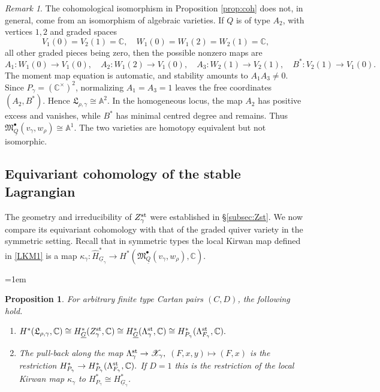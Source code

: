 \documentclass[11pt,reqno]{amsart}
\newtheorem{Proposition}[Theorem]{Proposition}
\theoremstyle{definition}
\theoremstyle{remark}
\newtheorem{Remark}[Theorem]{Remark}
\def\bbC{\mathbb C}
\def\dG{\underline G}
\def\dQ{\underline Q}
\def\scrX{\mathscr X}
\def\M{\mathfrak M}
\begin{document}
\begin{Remark}\label{rem:A2-not-isomorphic}
The cohomological isomorphism in Proposition \ref{prop:coh} does not, in general,
come from an isomorphism of algebraic varieties. If $Q$ is of type $A_2$, with vertices $1,2$ and graded spaces
\[
 V_1(0)=V_2(1)=\bbC,\quad
 W_1(0)=W_1(2)=W_2(1)=\bbC,
\]
all other graded pieces being zero, then the possible nonzero maps are
$$A_1:W_1(0)\to V_1(0),\quad
A_2:W_1(2)\to V_1(0),\quad
A_3:W_2(1)\to V_2(1),\quad
B^*:V_2(1)\to V_1(0).$$
The moment map equation is automatic, and stability amounts to
$A_1A_3\ne0$. Since $P_\gamma=(\mathbb C^\times)^2$, normalizing
$A_1=A_3=1$ leaves the free coordinates $(A_2,B^*)$. Hence
$\mathfrak L_{\rho,\gamma}\cong\mathbb A^2.$
In the homogeneous locus, the map $A_2$ has positive excess and vanishes,
while $B^*$ has minimal centred degree and remains. Thus
$\M_{\dQ}^\bullet(v_\gamma,w_\rho)\cong\mathbb A^1.$
The two varieties are homotopy equivalent but not isomorphic.
\end{Remark}



\subsection{Equivariant cohomology of the stable Lagrangian}\label{subsec:Zst-coh}
The geometry and irreducibility of $Z_\gamma^{\rm st}$ were established
in \S\ref{subsec:Zst}. We now compare its equivariant cohomology with
that of the graded quiver variety in the symmetric setting.
Recall that in symmetric types the local Kirwan map defined in \eqref{LKM1} is a map
$\kappa_\gamma: \widehat H^*_{\dG_\gamma}\to H^*(\M_{\dQ}^\bullet(v_\gamma,w_\rho),\bbC)$.


\begingroup\emergencystretch=1em
\begin{Proposition}\label{prop:cohZ}
For arbitrary finite type Cartan pairs $(C,D)$, the following hold.
\begin{enumerate}[label=$\mathrm{(\alph*)}$,leftmargin=8mm]
\item
$H^*(\mathfrak L_{\rho,\gamma},\bbC)\cong H^*_{\dG}(Z^{\rm st}_\gamma,\bbC)\cong H^*_{\dG}(\Lambda^{\rm st}_\gamma,\bbC)
\cong H^*_{P_\gamma}(\Lambda^{\rm st}_{F_\gamma},\bbC).$
\item
The  pull-back along the map
$\Lambda^{\rm st}_\gamma\to\scrX_\gamma,$ $(F,x,y)\mapsto(F,x)$ 
is the restriction 
$H^*_{P_\gamma}\to H^*_{P_\gamma}(\Lambda^{\rm st}_{F_\gamma},\bbC).$
If $D=1$ this is the restriction of the local Kirwan map $\kappa_\gamma$  to  
$H^*_{P_\gamma}\cong H_{\dG_\gamma}^*$. 
\end{enumerate}
\end{Proposition}
\endgroup
\end{document}
